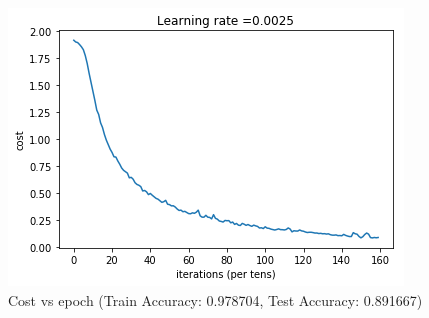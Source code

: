 \documentclass{article}
\begin{document}
\begin{figure}[h!]
	\centering
	\includegraphics[scale=0.55]{result0025ep160.png}
	\caption{Cost vs epoch (Train Accuracy: 0.978704,  Test Accuracy: 0.891667)}
	\label{fig:univerise}
\end{figure}


\newpage

\end{document}
